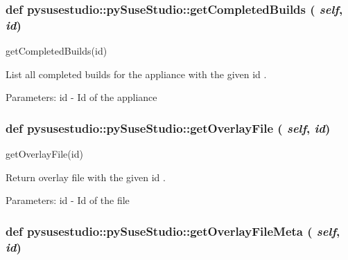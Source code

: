  \hypertarget{classpysusestudio_1_1py_suse_studio_a2dce0b6f9b748795beadf6b7776f2ebf}{
\subsubsection[{getCompletedBuilds}]{\setlength{\rightskip}{0pt plus 5cm}def pysusestudio::pySuseStudio::getCompletedBuilds ( {\em self}, \/   {\em id})}}
\label{classpysusestudio_1_1py_suse_studio_a2dce0b6f9b748795beadf6b7776f2ebf}
\begin{DoxyVerb}getCompletedBuilds(id)

        List all completed builds for the appliance with the given id .
        
            Parameters:
id - Id of the appliance

\end{DoxyVerb}
 \hypertarget{classpysusestudio_1_1py_suse_studio_a9afaf308e7145e0ece5f6ef04385c537}{
\subsubsection[{getOverlayFile}]{\setlength{\rightskip}{0pt plus 5cm}def pysusestudio::pySuseStudio::getOverlayFile ( {\em self}, \/   {\em id})}}
\label{classpysusestudio_1_1py_suse_studio_a9afaf308e7145e0ece5f6ef04385c537}
\begin{DoxyVerb}getOverlayFile(id)

        Return overlay file with the given id .
        
            Parameters:
id - Id of the file

\end{DoxyVerb}
 \hypertarget{classpysusestudio_1_1py_suse_studio_a18433f6c2be7dd749e2d7999e28b14f6}{
\subsubsection[{getOverlayFileMeta}]{\setlength{\rightskip}{0pt plus 5cm}def pysusestudio::pySuseStudio::getOverlayFileMeta ( {\em self}, \/   {\em id})}}
